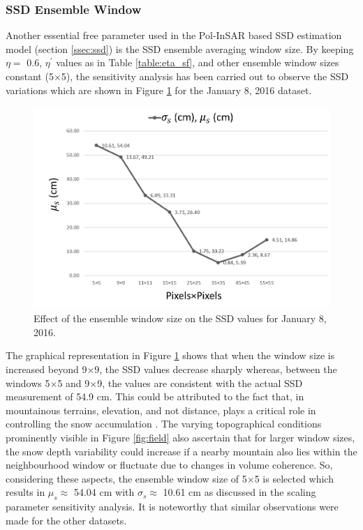 \documentclass[12pt]{elsarticle}
\numberwithin{equation}{section}
\numberwithin{figure}{section}
\numberwithin{table}{section}
\begin{document}
\subsubsection{SSD Ensemble Window}

Another essential free parameter used in the Pol-InSAR based SSD estimation model (section \ref{ssec:ssd}) is the SSD ensemble averaging window size. By keeping $\eta = $ 0.6, $\eta^\prime$ values as in Table \ref{table:eta_sf}, and other ensemble window sizes constant (5$\times$5), the sensitivity analysis has been carried out to observe the SSD variations which are shown in Figure \ref{fig:swindow} for the January 8, 2016 dataset. 

\begin{figure}[htb]
    \centering
    \includegraphics[width=\textwidth]{Figures/Results/SSD_Window.png}
    \caption{Effect of the ensemble window size on the SSD values for January 8, 2016.}
    \label{fig:swindow}
\end{figure}

The graphical representation in Figure \ref{fig:swindow} shows that when the window size is increased beyond 9$\times$9, the SSD values decrease sharply whereas, between the windows 5$\times$5 and 9$\times$9, the values are consistent with the actual SSD measurement of 54.9 cm. This could be attributed to the fact that, in mountainous terrains, elevation, and not distance, plays a critical role in controlling the snow accumulation \citep{Liu2017, Singh2014, Singh2017, Thakur2012}. The varying topographical conditions prominently visible in Figure \ref{fig:field} also ascertain that for larger window sizes, the snow depth variability could increase if a nearby mountain also lies within the neighbourhood window or fluctuate due to changes in volume coherence. So, considering these aspects, the ensemble window size of 5$\times$5 is selected which results in $\mu_s \approx$ 54.04 cm with $\sigma_s \approx$ 10.61 cm as discussed in the scaling parameter sensitivity analysis. It is noteworthy that similar observations were made for the other datasets.
\end{document}
